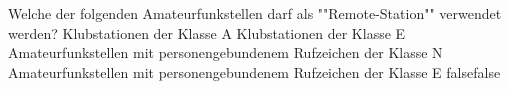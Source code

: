     {Welche der folgenden Amateurfunkstellen darf als ""Remote-Station"" verwendet werden?}
    {Klubstationen der Klasse A}
    {Klubstationen der Klasse E}
    {Amateurfunkstellen mit personengebundenem Rufzeichen der Klasse N}
    {Amateurfunkstellen mit personengebundenem Rufzeichen der Klasse E}
    {false}{false}